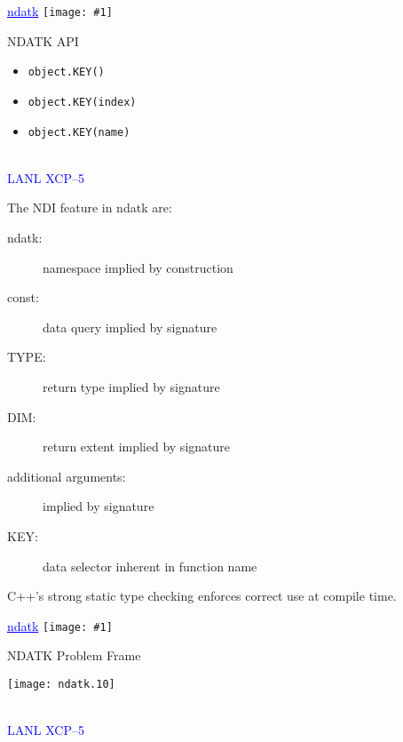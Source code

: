 \documentclass[clock]{slides}
\newenvironment{xslide}[1][logo.jpg]{\begin{slide} \tiny
\textcolor{blue}{\underline{ndatk}} \hfill
\texttt{[image: \#1]}
\normalsize}{\vfill\tiny
\textcolor{blue}{\hrulefill \\LANL XCP--5}
\end{slide}}
\begin{document}
\begin{xslide}
\begin{center}\Large
NDATK API
\end{center}

\begin{itemize}
\item \verb+object.KEY()+
\item \verb+object.KEY(index)+
\item \verb+object.KEY(name)+
\end{itemize}
\end{xslide}

\begin{note}\small
The NDI feature in ndatk are:
\begin{description}
\item[ndatk: ] namespace implied by construction
\item[const: ] data query implied by signature
\item[TYPE: ] return type implied by signature
\item[DIM: ] return extent implied by signature
\item[additional arguments: ] implied by signature
\item[KEY: ] data selector inherent in function name
\end{description}
C++'s strong static type checking enforces correct use at compile time. 
\end{note}    

\begin{xslide}
\begin{center}\Large
NDATK Problem Frame
\end{center}

\begin{center}
\texttt{[image: ndatk.10]}
\end{center}

\end{xslide}
\end{document}
